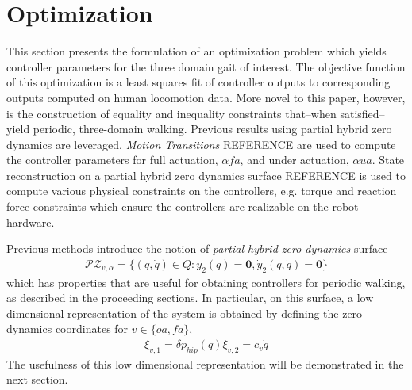 \section{Optimization}
This section presents the formulation of an optimization problem which yields controller parameters for the three domain gait of interest. The objective function of this optimization is a least squares fit of controller outputs to corresponding outputs computed on human locomotion data. More novel to this paper, however, is the construction of equality and inequality constraints that--when satisfied--yield periodic, three-domain walking. Previous results using partial hybrid zero dynamics are leveraged.  \textit{Motion Transitions} REFERENCE are used to compute the controller parameters for full actuation, $\alpha{fa}$, and under actuation, $\alpha{ua}$. State reconstruction on a partial hybrid zero dynamics surface REFERENCE is used to compute various physical constraints on the controllers, e.g. torque and reaction force constraints which ensure the controllers are realizable on the robot hardware.


Previous methods introduce the notion of \textit{partial hybrid zero dynamics} surface
\begin{align}
\label{PZD}
\mathcal{PZ}_{v,\alpha} = \{(q,\dot{q}) \in Q : y_{2}(q) = \mathbf{0}, \dot{y}_{2}(q,\dot{q}) = \mathbf{0}\}
\end{align}
which has properties that are useful for obtaining controllers for periodic walking, as described in the proceeding sections. In particular, on this surface, a low dimensional representation of the system is obtained by defining the zero dynamics coordinates for $v \in \{oa,fa\}$,
\begin{align}
\xi_{v,1} = \delta p_{hip}(q)
\xi_{v,2} = c_{v}\dot{q}
\end{align}
The usefulness of this low dimensional representation will be demonstrated in the next section.

